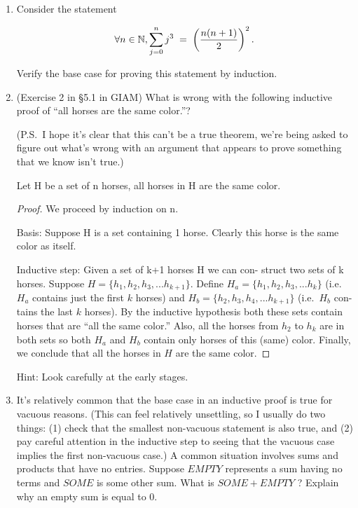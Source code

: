 \documentclass{amsart}
\begin{document}
\begin{enumerate}
\begin{enumerate}
\vfill

\end{enumerate}

\item Consider the statement

\[ \forall n \in {\mathbb N}, \sum_{j=0}^{n} j^3 \; = \; \left( \frac{n(n + 1)}{2} \right)^2. \]

Verify the base case for proving this statement by induction.

\vfill


\newpage

\item (Exercise 2 in \S 5.1 in GIAM) What is wrong with the following
inductive proof of ``all horses are the same color.''?

(P.S.\ I hope it’s clear that this can’t be a true theorem, we’re
being asked to figure out what’s wrong with an argument that
appears to prove something that we know isn’t true.)

\begin{thm*}
 Let H be a set of n horses, all horses in H are the
same color.
\end{thm*}

\begin{proof}
We proceed by induction on n.

Basis: \newline
Suppose H is a set containing 1 horse.  Clearly
this horse is the same color as itself.

Inductive step: \newline
Given a set of k+1 horses H we can con-
struct two sets of k horses.  Suppose $H = \{h_1 , h_2 , h_3 , {. . .} h_{k+1} \}$.
Define $H_a = \{h_1 , h_2 , h_3 , {. . .} h_{k} \}$ (i.e.\ $H_a$ contains just the
first $k$ horses) and $H_b = \{h_2 , h_3 , h_4 , {. . .} h_{k+1} \}$ (i.e.\ $H_b$ con-
tains the last $k$ horses).  By the inductive hypothesis both
these sets contain horses that are “all the same color.”
Also, all the horses from $h_2$ to $h_k$ are in both sets so both
$H_a$ and $H_b$ contain only horses of this (same) color.  Finally, we conclude that all the horses in $H$ are the same
color.
\end{proof}


Hint: Look carefully at the early stages.

\vfill

\newpage

\item It’s relatively common that the base case in an inductive proof is
true for vacuous reasons. (This can feel relatively unsettling, so
I usually do two things: (1) check that the smallest non-vacuous
statement is also true, and (2) pay careful attention in the inductive
step to seeing that the vacuous case implies the first non-vacuous
case.) A common situation involves sums and products that have
no entries.  Suppose $EMPTY$ represents a sum having no terms
and $SOME$ is some other sum.  What is $SOME + EMPTY$ ?
Explain why an empty sum is equal to 0.


\end{enumerate}
\end{document}
